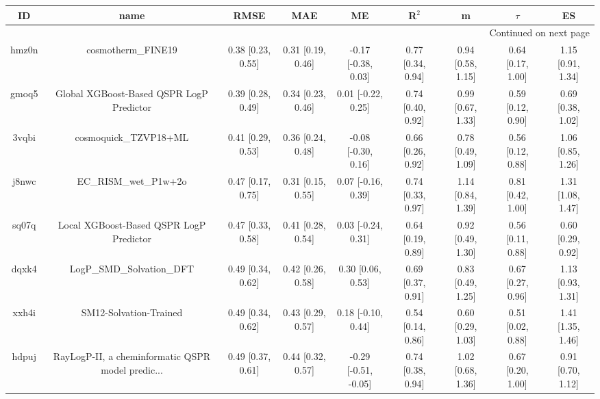 \documentclass{article}
\begin{document}
\begin{center}
\scriptsize
\begin{longtable}{|ccccccccc|}
\toprule
    ID &                                               name &               RMSE &                MAE &                    ME &              R$^2$ &                    m &               $\tau$ &                    ES \\
\midrule
\endhead
\midrule
\multicolumn{9}{r}{{Continued on next page}} \\
\midrule
\endfoot

\bottomrule
\endlastfoot
 hmz0n &                                 cosmotherm\_FINE19 &  0.38 [0.23, 0.55] &  0.31 [0.19, 0.46] &   -0.17 [-0.38, 0.03] &  0.77 [0.34, 0.94] &    0.94 [0.58, 1.15] &    0.64 [0.17, 1.00] &     1.15 [0.91, 1.34] \\
 gmoq5 &           Global XGBoost-Based QSPR LogP Predictor &  0.39 [0.28, 0.49] &  0.34 [0.23, 0.46] &    0.01 [-0.22, 0.25] &  0.74 [0.40, 0.92] &    0.99 [0.67, 1.33] &    0.59 [0.12, 0.90] &     0.69 [0.38, 1.02] \\
 3vqbi &                              cosmoquick\_TZVP18+ML &  0.41 [0.29, 0.53] &  0.36 [0.24, 0.48] &   -0.08 [-0.30, 0.16] &  0.66 [0.26, 0.92] &    0.78 [0.49, 1.09] &    0.56 [0.12, 0.88] &     1.06 [0.85, 1.26] \\
 j8nwc &                              EC\_RISM\_wet\_P1w+2o &  0.47 [0.17, 0.75] &  0.31 [0.15, 0.55] &    0.07 [-0.16, 0.39] &  0.74 [0.33, 0.97] &    1.14 [0.84, 1.39] &    0.81 [0.42, 1.00] &     1.31 [1.08, 1.47] \\
 sq07q &            Local XGBoost-Based QSPR LogP Predictor &  0.47 [0.33, 0.58] &  0.41 [0.28, 0.54] &    0.03 [-0.24, 0.31] &  0.64 [0.19, 0.89] &    0.92 [0.49, 1.30] &    0.56 [0.11, 0.88] &     0.60 [0.29, 0.92] \\
 dqxk4 &                          LogP\_SMD\_Solvation\_DFT &  0.49 [0.34, 0.62] &  0.42 [0.26, 0.58] &     0.30 [0.06, 0.53] &  0.69 [0.37, 0.91] &    0.83 [0.49, 1.25] &    0.67 [0.27, 0.96] &     1.13 [0.93, 1.31] \\
 xxh4i &                             SM12-Solvation-Trained &  0.49 [0.34, 0.62] &  0.43 [0.29, 0.57] &    0.18 [-0.10, 0.44] &  0.54 [0.14, 0.86] &    0.60 [0.29, 1.03] &    0.51 [0.02, 0.88] &     1.41 [1.35, 1.46] \\
 hdpuj &  RayLogP-II, a cheminformatic QSPR model predic... &  0.49 [0.37, 0.61] &  0.44 [0.32, 0.57] &  -0.29 [-0.51, -0.05] &  0.74 [0.38, 0.94] &    1.02 [0.68, 1.36] &    0.67 [0.20, 1.00] &     0.91 [0.70, 1.12] \\

\end{longtable}
\end{center}
\end{document}

